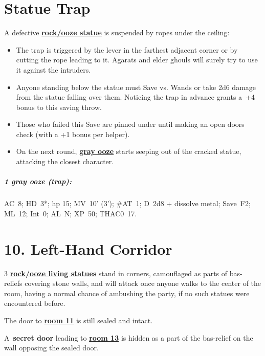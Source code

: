 \documentclass[english,11pt,openany,letterpaper,twocolumn]{book}
\begin{document}
\hypertarget{statue-trap}{}
\section{Statue Trap}

A defective \hyperlink{statue}{\textbf{rock/ooze statue}} is suspended by ropes under the ceiling:

\begin{itemize}[leftmargin=*]
	\item The trap is triggered by the lever in the farthest adjacent corner or by cutting the rope leading to it. Agarats and elder ghouls will surely try to use it against the intruders.
	\item Anyone standing below the statue must Save vs. Wands or take 2d6 damage from the statue falling over them. Noticing the trap in advance grants a~+4 bonus to this saving throw.
	\item Those who failed this Save are pinned under until making an open doors check (with a +1 bonus per helper).
	\item On the next round, \hyperlink{gray-ooze}{\textbf{gray ooze}} starts seeping out of the cracked statue, attacking the closest character.
\end{itemize}

\break
\vspace*{-1.11\baselineskip}
\begin{textbox}
	\subparagraph{1 gray ooze (trap):} AC~8; HD~3*; hp 15; MV~10' (3'); \#AT~1; D~2d8 + dissolve metal; Save~F2; ML~12; Int~0; AL~N; XP~50; THAC0~17.
\end{textbox}



\hypertarget{room10}{}
\section{10. Left-Hand Corridor}

3 \hyperlink{statue}{\textbf{rock/ooze living statues}} stand in corners, camouflaged as parts of bas- reliefs covering stone walls, and will attack once anyone walks to the center of the room, having a normal chance of ambushing the party, if no such statues were encountered before.

\tab The door to \hyperlink{room11}{\textbf{room 11}} is still sealed and intact.

\tab A~\textbf{secret door} leading to \hyperlink{room13}{\textbf{room 13}} is hidden as a part of the bas-relief on the wall opposing the sealed door.
\end{document}
